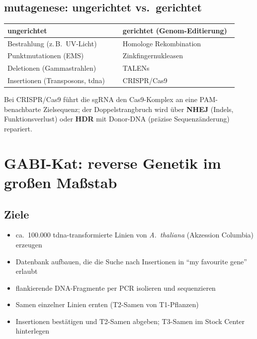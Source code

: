 \subsection*{\gls{mutagenese}: ungerichtet vs.\ gerichtet}\label{subsec:mutagenese:-ungerichtet-vs.-gerichtet}
\begin{mytable}
    \begin{tabular}{@{}|p{0.46\linewidth}|p{0.46\linewidth}|@{}}
        \hline
        \textbf{ungerichtet} & \textbf{gerichtet (Genom-Editierung)} \\
        \hline
        Bestrahlung (z.\,B.\ UV-Licht) & Homologe Rekombination \\
        Punktmutationen (EMS) & Zinkfingernukleasen \\
        Deletionen (Gammastrahlen) & TALENs \\
        Insertionen (Transposons, \gls{tdna}) & CRISPR/Cas9 \\
        \hline
    \end{tabular}
\end{mytable}
Bei CRISPR/Cas9 führt die sgRNA den Cas9-Komplex an eine PAM-benachbarte Zielsequenz; der Doppelstrangbruch wird über \textbf{NHEJ} (Indels, Funktionsverlust) oder \textbf{HDR} mit Donor-DNA (präzise Sequenzänderung) repariert.


\section{GABI-Kat: reverse Genetik im gro{\ss}en Ma{\ss}stab}\label{sec:gabi-kat:-reverse-genetik-im-gro{ss}en-ma{ss}stab}

\subsection*{Ziele}\label{subsec:ziele}
\begin{itemize}
    \item ca.\ 100.000 \gls{tdna}-transformierte Linien von \emph{A.~thaliana} (Akzession Columbia) erzeugen
    \item Datenbank aufbauen, die die Suche nach Insertionen in ``my favourite gene'' erlaubt
    \item flankierende DNA-Fragmente per PCR isolieren und sequenzieren
    \item Samen einzelner Linien ernten (T2-Samen von T1-Pflanzen)
    \item Insertionen bestätigen und T2-Samen abgeben; T3-Samen im Stock Center hinterlegen
\end{itemize}

